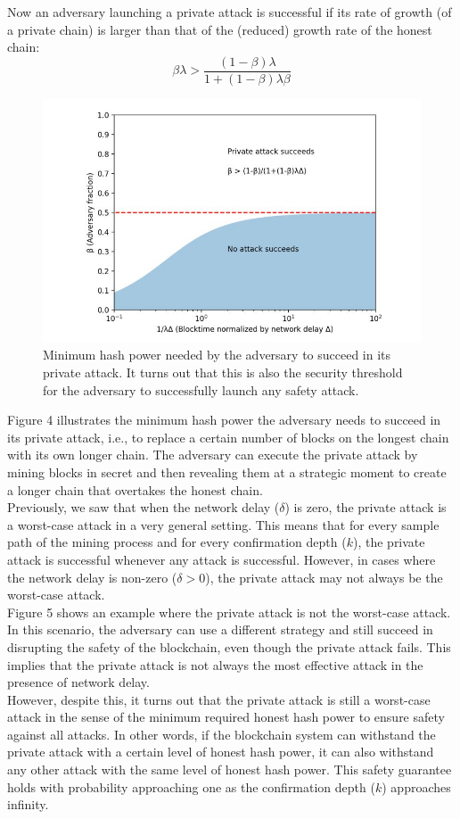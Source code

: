 Now an adversary launching a private attack is successful if its rate of growth (of a private chain) is larger than that of the (reduced) growth rate of the honest chain:
\begin{equation}
	\beta \lambda > \frac{(1 - \beta) \lambda}{1 + (1 - \beta) \lambda \beta}
\end{equation}
\begin{figure}[h!]
	\centering
	\includegraphics[width=0.6\linewidth]{Fig/06/F4}
	\caption{Minimum hash power needed by the adversary to succeed in its private attack. It turns
		out that this is also the security threshold for the adversary to successfully launch any safety attack.}
	\label{fig:f1}
\end{figure}
Figure 4 illustrates the minimum hash power the adversary needs to succeed in its private attack, i.e., to replace a certain number of blocks on the longest chain with its own longer chain. The adversary can execute the private attack by mining blocks in secret and then revealing them at a strategic moment to create a longer chain that overtakes the honest chain.\\
Previously, we saw that when the network delay ($\delta$) is zero, the private attack is a worst-case attack in a very general setting. This means that for every sample path of the mining process and for every confirmation depth ($k$), the private attack is successful whenever any attack is successful. However, in cases where the network delay is non-zero ($\delta > 0$), the private attack may not always be the worst-case attack.\\
Figure 5 shows an example where the private attack is not the worst-case attack. In this scenario, the adversary can use a different strategy and still succeed in disrupting the safety of the blockchain, even though the private attack fails. This implies that the private attack is not always the most effective attack in the presence of network delay.\\
However, despite this, it turns out that the private attack is still a worst-case attack in the sense of the minimum required honest hash power to ensure safety against all attacks. In other words, if the blockchain system can withstand the private attack with a certain level of honest hash power, it can also withstand any other attack with the same level of honest hash power. This safety guarantee holds with probability approaching one as the confirmation depth ($k$) approaches infinity.\\
